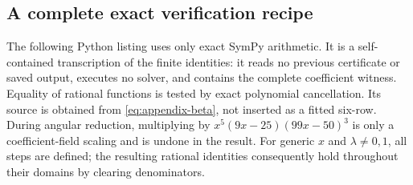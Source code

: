 \documentclass[11pt,a4paper]{article}
\begin{document}
\subsection{A complete exact verification recipe}

The following Python listing uses only exact SymPy arithmetic.  It is a
self-contained transcription of the finite identities: it reads no
previous certificate or saved output, executes no solver, and contains
the complete coefficient witness.  Equality of rational functions is
tested by exact polynomial cancellation.  Its source is obtained from
\eqref{eq:appendix-beta}, not inserted as a fitted six-row.  During
angular reduction, multiplying by
\(x^5(9x-25)(99x-50)^3\) is only a coefficient-field scaling and is
undone in the result.  For generic \(x\) and \(\lambda\ne0,1\), all
steps are defined; the resulting rational identities consequently hold
throughout their domains by clearing denominators.
\end{document}
